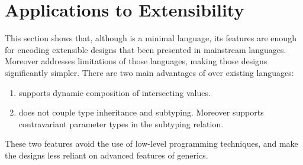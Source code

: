 \section{Applications to Extensibility} \label{sec:application}



This section shows that, although \name is a minimal language, its
features are enough for encoding extensible designs that been
presented in mainstream languages. Moreover \name addresses
limitations of those languages, making those designs significantly
simpler. There are two main advantages of \name over existing
languages:

\begin{enumerate}
\item \name supports dynamic composition of intersecting values.
\item \name does not couple type inheritance and subtyping. Moreover
  \name supports contravariant parameter types in the subtyping relation.
\end{enumerate}

These two features avoid the use of low-level programming techniques,
and make the designs less reliant on advanced features of generics. 

\begin{comment}
Various solutions have been proposed to deal with the extensibility problems and
many rely on heavyweight language features such as abstract methods and classes
in Java. These two features can be used to improve existing designs of modular
programs.

\bruno{I would like to see a story about Church Encodings in
  \name. Can you look at Pierce's papers and try to write something
  along those lines? That will be a good intro for object algebras and
visitors!}


\url{http://repository.cmu.edu/cgi/viewcontent.cgi?article=3018&context=compsci}
Church encoding allows modelling algebraic data types. 
\end{comment}





